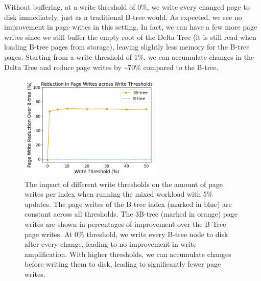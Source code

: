 Without buffering, at a write threshold of 0\%, we write every changed page to disk immediately, just as a traditional B-tree would.
As expected, we see no improvement in page writes in this setting.
In fact, we can have a few more page writes since we still buffer the empty root of the Delta Tree (it is still read when loading B-tree pages from storage), leaving slightly less memory for the B-tree pages.
Starting from a write threshold of 1\%, we can accumulate changes in the Delta Tree and reduce page writes by \textasciitilde70\% compared to the B-tree.

\begin{figure}[htbp]
  \centering
  \includegraphics[width=0.6\textwidth]{figures/evaluation/pageviews_mixed_write_thresholds.png}
  \caption{The impact of different write thresholds on the amount of page writes per index when running the mixed workload with 5\% updates. The page writes of the B-tree index (marked in blue) are constant across all thresholds. The 3B-tree (marked in orange) page writes are shown in percentages of improvement over the B-Tree page writes. At 0\% threshold, we write every B-tree node to disk after every change, leading to no improvement in write amplification. With higher thresholds, we can accumulate changes before writing them to disk, leading to significantly fewer page writes.}
  \label{fig:write_thresholds}
\end{figure}

